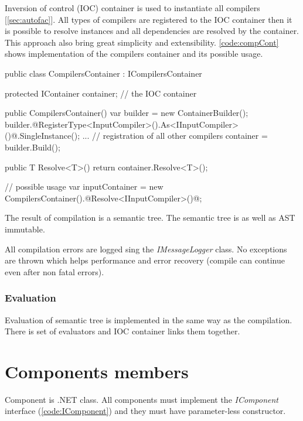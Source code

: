 Inversion of control (IOC)  container is used to instantiate all compilers [\ref{sec:autofac}].
All types of compilers are registered to the IOC container then it is possible to resolve instances and all dependencies are resolved by the container.
This approach also bring great simplicity and extensibility.
\autoref{code:compCont} shows implementation of the compilers container and its possible usage.

\begin{Csharp}[label=code:compCont,caption={General interface for compilers and interface for the expression compiler}]
public class CompilersContainer : ICompilersContainer {
	protected IContainer container;  // the IOC container	

	public CompilersContainer() {
		var builder = new ContainerBuilder();
		builder.@RegisterType<InputCompiler>().As<IInputCompiler>()@.SingleInstance();
		...  // registration of all other compilers
		container = builder.Build();
	}

	public T Resolve<T>() {
		return container.Resolve<T>();
	}
}

// possible usage
var inputContainer = new CompilersContainer().@Resolve<IInputCompiler>()@;
\end{Csharp}

The result of compilation is a semantic tree.
The semantic tree is as well as AST immutable.

All compilation errors are logged sing the \emph{IMessageLogger} class.
No exceptions are thrown which helps performance and error recovery (compile can continue even after non fatal errors). 

\subsubsection*{Evaluation}

Evaluation of semantic tree is implemented in the same way as the compilation.
There is set of evaluators and IOC container links them together.



\section{Components members}
\label{sec:compImplementaion}

Component is .NET class.
All components must implement the \emph{IComponent} interface (\autoref{code:IComponent}) and they must have parameter-less constructor.

